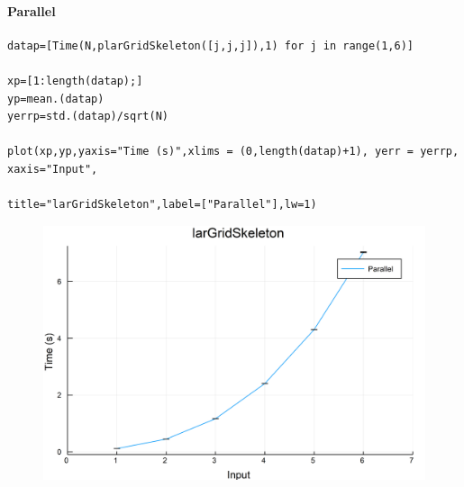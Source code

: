 \documentclass{article}
\begin{document}
\paragraph{Parallel}
\begin{flushleft}\small
\begin{list}{}{} \item
    \begin{Verbatim}[tabsize=4]
datap=[Time(N,plarGridSkeleton([j,j,j]),1) for j in range(1,6)]

xp=[1:length(datap);]
yp=mean.(datap)
yerrp=std.(datap)/sqrt(N)

plot(xp,yp,yaxis="Time (s)",xlims = (0,length(datap)+1), yerr = yerrp, xaxis="Input", 
                                            title="larGridSkeleton",label=["Parallel"],lw=1)
    \end{Verbatim}
\end{list}
\end{flushleft}  
\begin{figure}[h!]
\centering
\includegraphics[scale=0.06]{larGridSkeletonPar.png}
\end{figure}
\end{document}
